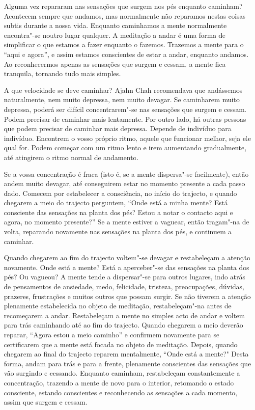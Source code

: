 Alguma vez repararam nas sensações que surgem nos pés enquanto caminham?
Acontecem sempre que andamos, mas normalmente não reparamos nestas
coisas subtis durante a nossa vida. Enquanto caminhamos a mente
normalmente encontra"-se noutro lugar qualquer. A meditação a andar é uma
forma de simplificar o que estamos a fazer enquanto o fazemos. Trazemos
a mente para o ``aqui e agora'', e assim estamos conscientes de estar a
andar, enquanto andamos. Ao reconhecermos apenas as sensações que surgem
e cessam, a mente fica tranquila, tornando tudo mais simples.

A que velocidade se deve caminhar? Ajahn Chah recomendava que
andássemos naturalmente, nem muito depressa, nem muito devagar. Se
caminharem muito depressa, poderá ser difícil concentrarem"-se nas
sensações que surgem e cessam. Podem precisar de caminhar mais
lentamente. Por outro lado, há outras pessoas que podem precisar de
caminhar mais depressa. Depende de indivíduo para indivíduo. Encontrem o
vosso próprio ritmo, aquele que funcionar melhor, seja ele qual for.
Podem começar com um ritmo lento e irem aumentando gradualmente, até
atingirem o ritmo normal de andamento.

Se a vossa concentração é fraca (isto é, se a mente dispersa"-se facilmente),
então andem muito devagar, até conseguirem estar no momento presente a
cada passo dado. Comecem por estabelecer a consciência, no início do
trajecto, e quando chegarem a meio do trajecto perguntem, ``Onde está a minha
mente? Está consciente das sensações na planta dos pés? Estou a notar o
contacto aqui e agora, no momento presente?'' Se a mente estiver a
vaguear, então tragam"-na de volta, reparando novamente nas sensações na
planta dos pés, e continuem a caminhar.

Quando chegarem ao fim do trajecto voltem"-se devagar e restabeleçam a atenção novamente. Onde está a mente? Está a aperceber"-se das sensações
na planta dos pés? Ou vagueou? A mente tende a dispersar"-se para outros
lugares, indo atrás de pensamentos de ansiedade, medo, felicidade,
tristeza, preocupações, dúvidas, prazeres, frustrações e muitos outros
que possam surgir. Se não tiverem a atenção plenamente estabelecida no
objeto de meditação, restabeleçam"-na antes de recomeçarem a andar.
Restabeleçam a mente no simples acto de andar e voltem para trás
caminhando até ao fim do trajecto. Quando chegarem a meio deverão
reparar, ``Agora estou a meio caminho'' e confirmem novamente para se
certificarem que a mente está focada no objeto de meditação. Depois,
quando chegarem ao final do trajecto reparem mentalmente, ``Onde está a
mente?" Desta forma, andam para trás e para a frente, plenamente
conscientes das sensações que vão surgindo e cessando. Enquanto
caminham, restabeleçam constantemente a concentração, trazendo a mente de
novo para o interior, retomando o estado consciente, estando conscientes e
reconhecendo as sensações a cada momento, assim que surgem e cessam.

